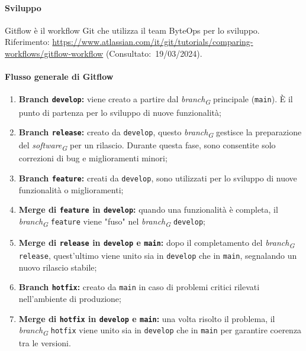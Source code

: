 \paragraph{Sviluppo}
Gitflow è il workflow Git che utilizza il team ByteOps per lo sviluppo.\\
Riferimento: \url{https://www.atlassian.com/it/git/tutorials/comparing-workflows/gitflow-workflow} (Consultato:~19/03/2024).

\paragraph*{Flusso generale di Gitflow}

\begin{enumerate}
    \item \textbf{Branch \texttt{develop}:} viene creato a partire dal \textit{branch}\textsubscript{\textit{G}} principale (\texttt{main}). È il punto di partenza per lo sviluppo di nuove funzionalità;

    \item \textbf{Branch \texttt{release}:} creato da \texttt{develop}, questo \textit{branch}\textsubscript{\textit{G}} gestisce la preparazione del \textit{software}\textsubscript{\textit{G}} per un rilascio. Durante questa fase, sono consentite solo correzioni di bug e miglioramenti minori;

    \item \textbf{Branch \texttt{feature}:} creati da \texttt{develop}, sono utilizzati per lo sviluppo di nuove funzionalità o miglioramenti; 

    \item \textbf{Merge di \texttt{feature} in \texttt{develop}:} quando una funzionalità è completa, il \textit{branch}\textsubscript{\textit{G}} \texttt{feature} viene "fuso" nel \textit{branch}\textsubscript{\textit{G}} \texttt{develop};

    \item \textbf{Merge di \texttt{release} in \texttt{develop} e \texttt{main}:} dopo il completamento del \textit{branch}\textsubscript{\textit{G}} \texttt{release}, quest'ultimo viene unito sia in \texttt{develop} che in \texttt{main}, segnalando un nuovo rilascio stabile;

    \item \textbf{Branch \texttt{hotfix}:} creato da \texttt{main} in caso di problemi critici rilevati nell'ambiente di produzione;

    \item \textbf{Merge di \texttt{hotfix} in \texttt{develop} e \texttt{main}:} una volta risolto il problema, il \textit{branch}\textsubscript{\textit{G}} \texttt{hotfix} viene unito sia in \texttt{develop} che in \texttt{main} per garantire coerenza tra le versioni.
\end{enumerate}

